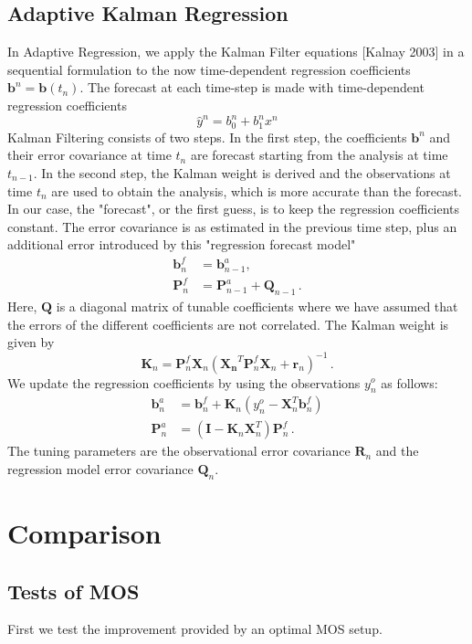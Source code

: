 \documentclass[10pt]{article}
\newcommand{\bt}[1]{\mathbf{#1}}
\begin{document}
\subsection{Adaptive Kalman Regression}
In Adaptive Regression, we apply the Kalman Filter equations [Kalnay 2003] in a sequential formulation to the now time-dependent regression coefficients $\mathbf{b}^n = \mathbf{b}(t_n)$. The forecast at each time-step is made with time-dependent regression coefficients 
\[ \hat{y}^n = b_{0}^n + b_{1}^n x^n  \]
Kalman Filtering consists of two steps. In the first step, the coefficients $\mathbf{b}^n$ and their error covariance at time $t_n$ are forecast starting from the analysis at time $t_{n-1}$. In the second step, the Kalman weight is derived and the observations at time $t_n$ are used to obtain the analysis, which is more accurate than the forecast. In our case, the "forecast", or the first guess, is to keep the regression coefficients constant. The error covariance is as estimated in the previous time step, plus an additional error introduced by this "regression forecast model"
\begin{align}
\mathbf{b}_n^f &= \mathbf{b}_{n-1}^a,  \\
\mathbf{P}_n^f & = \mathbf{P}_{n-1}^a + \mathbf{Q}_{n-1}\,.
\end{align}
Here, $\mathbf{Q}$ is a diagonal matrix of tunable coefficients where we have assumed that the errors of the different coefficients are not correlated. The Kalman weight is given by
\[ \mathbf{K}_n = \mathbf{P}_n^f \mathbf{X}_n (\mathbf{X_n}^T \mathbf{P}_n^f \bt{X}_n + \bt{r}_n )^{-1}\,.\]
We update the regression coefficients by using the observations $y^o_n$ as follows:
\begin{align}
\bt{b}_n^a &= \bt{b}_n^f + \bt{K}_n (y_n^o - \bt{X}_n^T \bt{b}_n^f) \\
\bt{P}_n^a &=  (\bt{I} - \bt{K}_n \bt{X}_n^T) \bt{P}_n^f \,.
\end{align}
The tuning parameters are the observational error covariance $\bt{R}_n$ and the regression model error covariance $\bt{Q}_n$. 

\section{Comparison}

\subsection{Tests of MOS}
First we test the improvement provided by an optimal MOS setup. 
\end{document}

